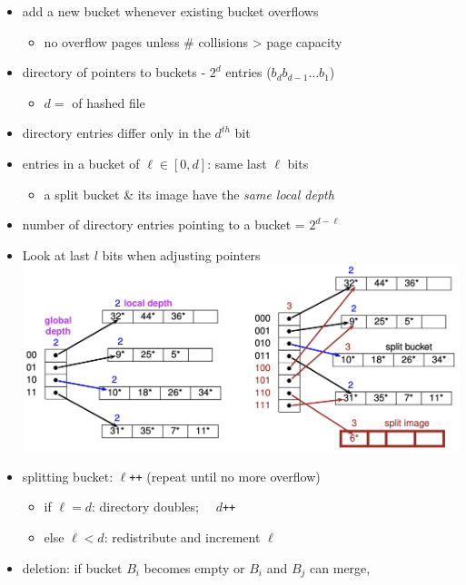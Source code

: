 \documentclass[10pt, landscape]{article}
\begin{document}
\begin{multicols*}{4}
  \begin{itemize}
    \item add a new bucket whenever existing bucket overflows 
      \begin{itemize}
        \item no overflow pages unless \# collisions > page capacity 
      \end{itemize}
    \item directory of pointers to buckets - $2^d$ entries ($b_db_{d-1}\dots b_1$)
      \begin{itemize}
        \item $d=$  of hashed file
      \end{itemize}
    \item {} directory entries differ only in the $d^{th}$ bit
    \item entries in a bucket of  $\ell \in [0,d]$: same last $\ell$ bits
      \begin{itemize}
        \item a split bucket \& its image have the \textit{same local depth}
      \end{itemize}
    \item number of directory entries pointing to a bucket = $2^{d-\ell}$
    \item Look at last $l$ bits when adjusting pointers
      \includegraphics[width=0.95\linewidth]{cs3223-extendible-hashing.png} 
    \item splitting bucket: $\ell$\texttt{++} (repeat until no more overflow)
      \begin{itemize}
        \item if $\ell = d$: directory doubles; $\quad d$\texttt{++}
        \item else $\ell < d$: redistribute and increment $\ell$
      \end{itemize}
    \item deletion: if bucket $B_i$ becomes empty or $B_i$ and $B_j$ can merge,

\end{itemize}
\end{multicols*}
\end{document}
